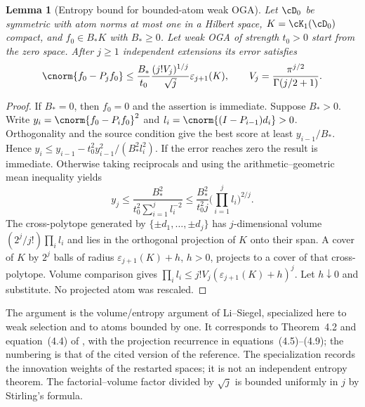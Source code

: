 \documentclass[11pt]{article}
\newtheorem{lemma}[theorem]{Lemma}
\theoremstyle{remark}
\begin{document}
\begin{lemma}[Entropy bound for bounded-atom weak OGA]
\label{lem:c5-entropy}
Let $\cD_0$ be symmetric with atom norms at most one in a Hilbert space,
$K=\cK_1(\cD_0)$ compact, and $f_0\in B_*K$ with $B_*\geq0$.
Let weak OGA of strength $t_0>0$ start from the zero space.
After $j\geq1$ independent extensions its error satisfies
\begin{equation}
 \cnorm{f_0-P_jf_0}\leq
 \frac{B_*}{t_0}\frac{(j!V_j)^{1/j}}{\sqrt j}
                    \varepsilon_{j+1}(K),\qquad
 V_j=\frac{\pi^{j/2}}{\Gamma(j/2+1)} .
 \label{eq:c5-entropy}
\end{equation}
\end{lemma}
\begin{proof}
If $B_*=0$, then $f_0=0$ and the assertion is immediate. Suppose $B_*>0$.
Write $y_i=\cnorm{f_0-P_if_0}^2$ and
$l_i=\cnorm{(I-P_{i-1})d_i}>0$.
Orthogonality and the source condition give the best score at least
$y_{i-1}/B_*$. Hence
$y_i\leq y_{i-1}-t_0^2y_{i-1}^2/(B_*^2l_i^2)$.
If the error reaches zero the result is immediate. Otherwise taking
reciprocals and using the arithmetic--geometric mean inequality yields
\[
 y_j\leq \frac{B_*^2}{t_0^2\sum_{i=1}^jl_i^{-2}}
 \leq \frac{B_*^2}{t_0^2j}\Big(\prod_{i=1}^jl_i\Big)^{2/j}.
\]
The cross-polytope generated by $\{\pm d_1,\ldots,\pm d_j\}$ has
$j$-dimensional volume $(2^j/j!)\prod_i l_i$ and lies in the orthogonal
projection of $K$ onto their span. A cover of $K$ by $2^j$ balls of radius
\(\varepsilon_{j+1}(K)+h\), \(h>0\), projects to a cover of that
cross-polytope. Volume comparison gives
$\prod_i l_i\leq j!V_j(\varepsilon_{j+1}(K)+h)^j$.
Let $h\downarrow0$ and substitute. No projected atom was rescaled.
\end{proof}

The argument is the volume/entropy argument of Li--Siegel, specialized here
to weak selection and to atoms bounded by one. It corresponds
to Theorem~4.2 and equation~(4.4) of \cite{LiSiegelEntropy2024}, with the
projection recurrence in equations~(4.5)--(4.9); the numbering is that of the
cited version of the reference. The specialization records the innovation
weights of the restarted spaces; it is not an independent entropy theorem.
The factorial--volume factor divided by $\sqrt j$ is bounded uniformly
in $j$ by Stirling's formula.
\end{document}
